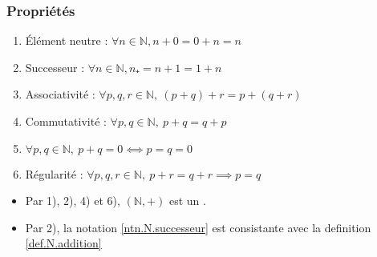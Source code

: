 \subsubsection{Propriétés}
%
\begin{theorem}
\par\noindent
%
\begin{enumerate}
\item
Élément neutre : \(∀𝑛∈ℕ,𝑛+0=0+𝑛=𝑛\) 
\item
Successeur : \(∀𝑛∈ℕ,𝑛₊=𝑛+1=1+𝑛\) 
\item
Associativité : \(∀𝑝,𝑞,𝑟∈ℕ,\ (𝑝+𝑞)+𝑟=𝑝+(𝑞+𝑟)\) 
\item
Commutativité : \(∀𝑝,𝑞∈ℕ,\ 𝑝+𝑞=𝑞+𝑝\) 
\item %
\(
∀𝑝,𝑞∈ℕ,\ 𝑝+𝑞=0⟺𝑝=𝑞=0
\)
\item Régularité : \(∀𝑝,𝑞,𝑟∈ℕ,\ 𝑝+𝑟=𝑞+𝑟⟹𝑝=𝑞\) 
\end{enumerate}
\end{theorem}
\begin{remark}
\vspace{-\baselineskip}
\begin{itemize}
\item
Par 1), 2), 4) et 6), \((ℕ,+)\) est un .
\item
Par 2), la notation \ref{ntn.N.successeur} est consistante avec la definition \ref{def.N.addition}
\end{itemize}
\end{remark}
%
